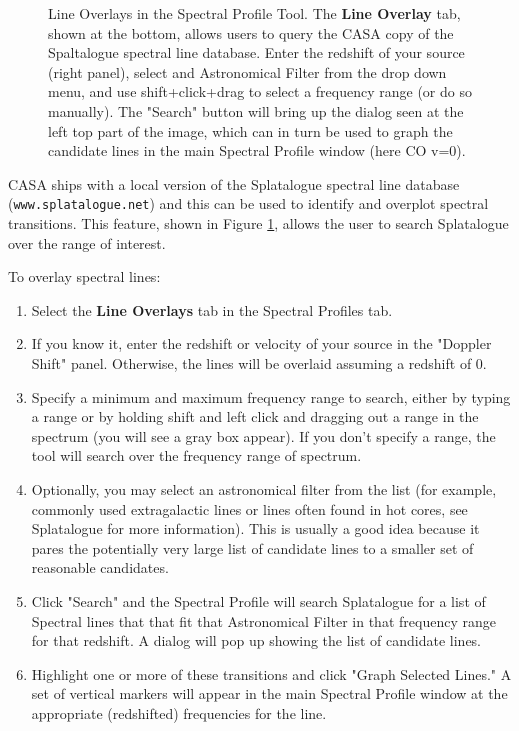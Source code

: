 \begin{figure}[h!]
\begin{center}
\caption{\label{fig:viewer_lineoverlay} Line Overlays in the Spectral Profile Tool. The {\bf Line Overlay} tab, shown at the bottom,
allows users to query the CASA copy of the Spaltalogue spectral line database. Enter the redshift of your source (right panel),
select and Astronomical Filter from the drop down menu, and use shift+click+drag to select a frequency range (or do so manually). 
The "Search" button will bring up the dialog seen at the left top part of the image, which can in turn be used to graph the candidate
lines in the main Spectral Profile window (here CO v=0).}
\hrulefill
\end{center}
\end{figure}

CASA ships with a local version of the Splatalogue spectral line database ({\tt www.splatalogue.net}) and this can be used to identify and overplot 
spectral transitions. This feature, shown in Figure \ref{fig:viewer_lineoverlay}, allows the user to search Splatalogue
over the range of interest. 

To overlay spectral lines:

\begin{enumerate}
\item Select the {\bf Line Overlays} tab in the Spectral Profiles tab.
\item If you know it, enter the redshift or velocity of your source in the "Doppler Shift" panel. Otherwise, the lines will be
overlaid assuming a redshift of 0.
\item Specify a minimum and maximum frequency range to search, either by typing a range or by holding 
shift and left click and dragging out a range in the spectrum (you will see a gray box appear). If you don't specify a range,
the tool will search over the frequency range of spectrum.
\item Optionally, you may select an astronomical filter from the list (for example, commonly used extragalactic lines or lines
often found in hot cores, see Splatalogue for more information). This is 
usually a good idea because it pares the potentially very large list of  candidate lines to a smaller set of reasonable candidates. 
\item Click "Search" and the Spectral Profile will search Splatalogue for a list of Spectral lines that that fit that Astronomical
Filter in that frequency range for that redshift. A dialog will pop up showing the list of candidate lines. 
\item Highlight one or more of these transitions and click "Graph Selected Lines." A set of vertical markers will 
appear in the main Spectral Profile window at the appropriate (redshifted) frequencies for the line.
\end{enumerate}

